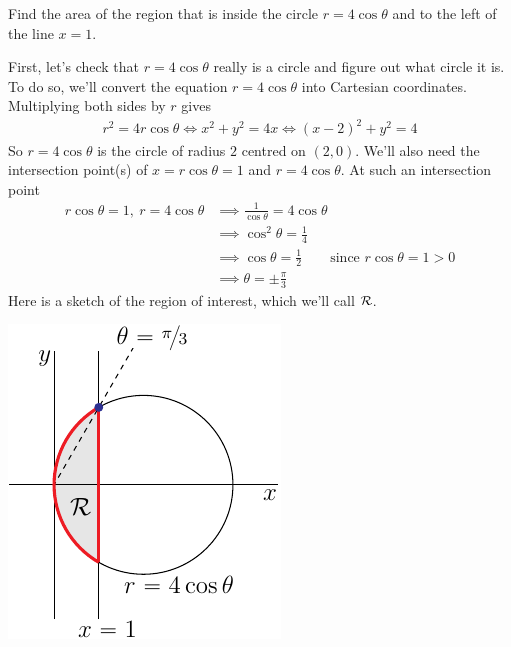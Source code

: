 \begin{eg}
\end{eg}



\goodbreak
\begin{eg}\label{eg area polar}
Find the area of the region that is inside the circle
$r=4\cos\theta$ and to the left of the line $x=1$.

\soln
First, let's check that $r=4\cos\theta$ really is a circle and figure out
what circle it is. To do so, we'll convert the equation $r=4\cos\theta$
into Cartesian coordinates. Multiplying both sides by $r$ gives
\begin{align*}
r^2=4r\cos\theta
\iff x^2+y^2 =4x
\iff (x-2)^2 + y^2 = 4
\end{align*}
So $r=4\cos\theta$ is the circle of radius $2$ centred on $(2,0)$.
We'll also need the intersection point(s) of $x=r\cos\theta=1$ 
and $r=4\cos\theta$. At such an intersection point
\begin{align*}
r\cos\theta=1,\ r=4\cos\theta
&\implies \frac{1}{\cos\theta} = 4\cos\theta \\
&\implies \cos^2\theta = \frac{1}{4} \\
&\implies \cos\theta =\frac{1}{2}\qquad\text{since }r\cos\theta=1 > 0 \\
&\implies \theta = \pm \frac{\pi}{3}
\end{align*}
Here is a sketch of the region of interest, which we'll call $\mathcal{R}$. 

\begin{efig}
\begin{center}
    \includegraphics{comPolarA.pdf}
\end{center}
\end{efig}


\end{eg}
